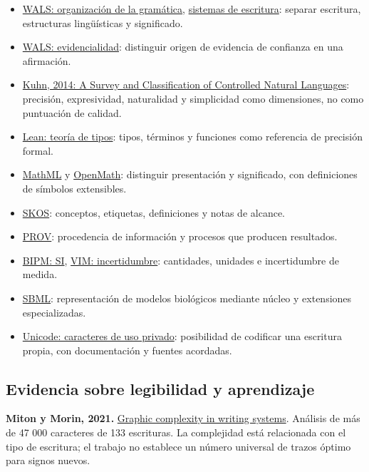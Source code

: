 \begin{itemize}
\item \href{https://wals.info/chapter/s1}{WALS: organización de la gramática}, \href{https://wals.info/chapter/141}{sistemas de escritura}: separar escritura, estructuras lingüísticas y significado.
\item \href{https://wals.info/chapter/77}{WALS: evidencialidad}: distinguir origen de evidencia de confianza en una afirmación.
\item \href{https://aclanthology.org/J14-1005/}{Kuhn, 2014: A Survey and Classification of Controlled Natural Languages}: precisión, expresividad, naturalidad y simplicidad como dimensiones, no como puntuación de calidad.
\item \href{https://lean-lang.org/theorem_proving_in_lean4/Dependent-Type-Theory/}{Lean: teoría de tipos}: tipos, términos y funciones como referencia de precisión formal.
\item \href{https://www.w3.org/TR/mathml4/}{MathML} y \href{https://openmath.org/standard/om20-2019-07-01/omstd20.html}{OpenMath}: distinguir presentación y significado, con definiciones de símbolos extensibles.
\item \href{https://www.w3.org/TR/skos-primer/}{SKOS}: conceptos, etiquetas, definiciones y notas de alcance.
\item \href{https://www.w3.org/TR/prov-primer/}{PROV}: procedencia de información y procesos que producen resultados.
\item \href{https://www.bipm.org/en/publications/si-brochure}{BIPM: SI}, \href{https://jcgm.bipm.org/vim/en/2.26.html}{VIM: incertidumbre}: cantidades, unidades e incertidumbre de medida.
\item \href{https://sbml.org/documents/what-is-sbml/}{SBML}: representación de modelos biológicos mediante núcleo y extensiones especializadas.
\item \href{https://www.unicode.org/faq/private_use.html}{Unicode: caracteres de uso privado}: posibilidad de codificar una escritura propia, con documentación y fuentes acordadas.
\end{itemize}

\subsection{Evidencia sobre legibilidad y aprendizaje}

\textbf{Miton y Morin, 2021.} \href{https://pmc.ncbi.nlm.nih.gov/articles/PMC8346946/}{Graphic complexity in writing systems}. Análisis de más de 47 000 caracteres de 133 escrituras. La complejidad está relacionada con el tipo de escritura; el trabajo no establece un número universal de trazos óptimo para signos nuevos.


